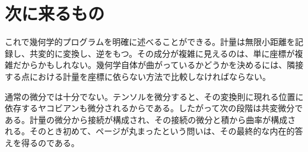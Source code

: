 \begin{classroomqa}
\end{classroomqa}

\section{次に来るもの}

これで幾何学的プログラムを明確に述べることができる。計量は無限小距離を記録し、共変的に変換し、逆をもつ。その成分が複雑に見えるのは、単に座標が複雑だからかもしれない。幾何学自体が曲がっているかどうかを決めるには、隣接する点における計量を座標に依らない方法で比較しなければならない。

通常の微分では十分でない。テンソルを微分すると、その変換則に現れる位置に依存するヤコビアンも微分されるからである。したがって次の段階は共変微分である。計量の微分から接続が構成され、その接続の微分と積から曲率が構成される。そのとき初めて、ページが丸まったという問いは、その最終的な内在的答えを得るのである。
